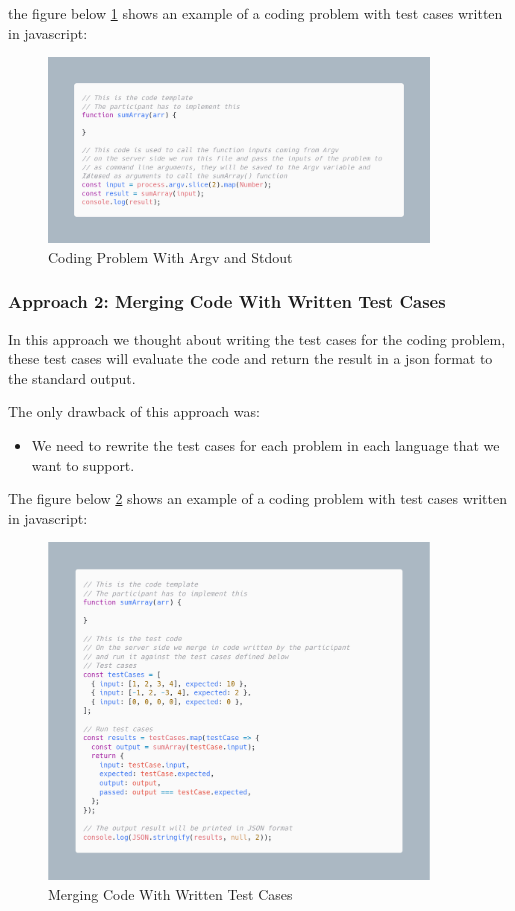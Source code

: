 the figure below \ref{fig:approach1} shows an example of a coding problem with test cases written in javascript:

\begin{figure}[h!]
  \centering
  \includegraphics[width=0.9\textwidth]{images/approach1.png}
  \caption{Coding Problem With Argv and Stdout}\label{fig:approach1}
\end{figure}

\subsubsection{Approach 2: Merging Code With Written Test Cases}
In this approach we thought about writing the test cases for the coding problem,
these test cases will evaluate the code and return the result in a json format to the standard output.

The only drawback of this approach was:
\begin{itemize}
  \item We need to rewrite the test cases for each problem in each language that we want to support.
\end{itemize}

The figure below \ref{fig:approach3} shows an example of a coding problem with test cases written in javascript:

\begin{figure}[h!]
  \centering
  \includegraphics[width=0.9\textwidth]{images/approach3.png}
  \caption{Merging Code With Written Test Cases}\label{fig:approach3}
\end{figure}


